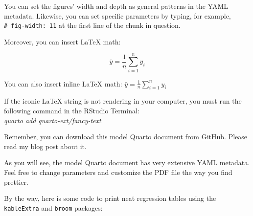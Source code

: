 \documentclass[
  12pt,
  letterpaper,
  DIV=11,
  numbers=noendperiod]{scrartcl}
\begin{document}
You can set the figures' width and depth as general patterns in the YAML
metadata. Likewise, you can set specific parameters by typing, for
example, \texttt{\#\textbar{}\ fig-width:\ 11} at the first line of the
chunk in question.

Moreover, you can insert {\LaTeX} math:

\[
\bar{y} = \frac{1}{n}\sum_{i=1}^n y_i
\]

You can also insert inline {\LaTeX} math:
\(\bar{y} = \frac{1}{n}\sum_{i=1}^n y_i\)

\begin{tcolorbox}[enhanced jigsaw, breakable, bottomtitle=1mm, coltitle=black, toprule=.15mm, bottomrule=.15mm, toptitle=1mm, arc=.35mm, colbacktitle=quarto-callout-important-color!10!white, rightrule=.15mm, left=2mm, opacitybacktitle=0.6, titlerule=0mm, leftrule=.75mm, opacityback=0, colframe=quarto-callout-important-color-frame, colback=white, title=\textcolor{quarto-callout-important-color}{\faExclamation}\hspace{0.5em}{Install extension}]

If the iconic {\LaTeX} string is not rendering in your computer, you
must run the following command in the RStudio Terminal:\\

\emph{quarto add quarto-ext/fancy-text}

\end{tcolorbox}

Remember, you can download this model Quarto document from
\href{https://github.com/ealvaradomena/class_repo}{GitHub}. Please read
my blog post about it.

As you will see, the model Quarto document has very extensive YAML
metadata. Feel free to change parameters and customize the PDF file the
way you find prettier.

By the way, here is some code to print neat regression tables using the
\texttt{kableExtra} and \texttt{broom} packages:
\end{document}
